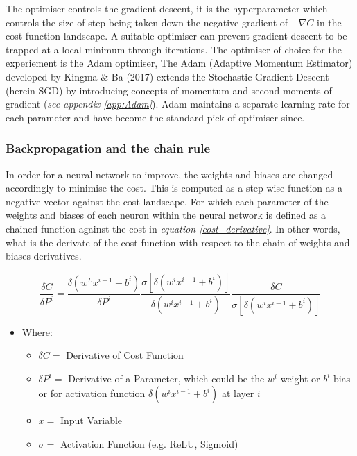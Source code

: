 \documentclass[11pt, a4paper, twoside]{report}
\begin{document}
The optimiser controls the gradient descent, it is the hyperparameter which controls the size of step being taken down the negative gradient of $- \nabla C$ in the cost function landscape. A suitable optimiser can prevent gradient descent to be trapped at a local minimum through iterations. The optimiser of choice for the experiement is the Adam optimiser, The Adam (Adaptive Momentum Estimator) developed by Kingma \& Ba (2017) extends the Stochastic Gradient Descent (herein SGD) by introducing concepts of momentum and second moments of gradient (\textit{see appendix \ref{app:Adam}}). Adam maintains a separate learning rate for each parameter and have become the standard pick of optimiser since.\\\par

\subsubsection{Backpropagation and the chain rule}\label{Backprop&Chain}

In order for a neural network to improve, the weights and biases are changed accordingly to minimise the cost. This is computed as a step-wise function as a negative vector against the cost landscape. For which each parameter of the weights and biases of each neuron within the neural network is defined as a chained function against the cost in \textit{equation \ref{cost_derivative}}. In other words, what is the derivate of the cost function with respect to the chain of weights and biases derivatives.\\\par

\begin{equation}
  \label{cost_derivative}
  \frac{\delta C}{\delta P^{i}} = \frac{\delta(w^{L}x^{i-1} + b^{i})}{\delta P^{i}} \frac{\sigma[\delta(w^{i}x^{i-1} + b^{i})]}{\delta (w^{i}x^{i-1} + b^{i})} \frac{\delta C}{\sigma[\delta(w^{i}x^{i-1} + b^{i})]}
\end{equation}

\begin{itemize}
  \item Where:
    \begin{itemize}
      \item $\delta C =$ Derivative of Cost Function
      \item $\delta P^{i} =$ Derivative of a Parameter, which could be the $w^{i}$ weight or $b^{i}$ bias or for activation function $\delta(w^{i}x^{i-1} + b^{i})$ at layer $i$
      \item $x = $ Input Variable
      \item $\sigma =$ Activation Function (e.g. ReLU, Sigmoid)
   \end{itemize}
\end{itemize}
\end{document}
